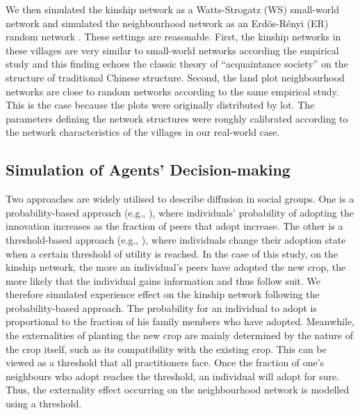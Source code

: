 \documentclass{bmcart}
\begin{document}
We then simulated the kinship network as a Watts-Strogatz (WS) small-world network \cite{Watts1998} and simulated the neighbourhood network as an Erd\"{o}s-R\'{e}nyi (ER) random network \cite{ErdHos1959}. These settings are reasonable. First, the kinship networks in these villages are very similar to small-world networks according the empirical study \cite{Xiong2017} and this finding echoes the classic theory of ``acquaintance society'' on the structure of traditional Chinese structure. Second, the land plot neighbourhood networks are close to random networks according to the same empirical study. This is the case because the plots were originally distributed by lot. The parameters defining the network structures were roughly calibrated according to the network characteristics of the villages in our real-world case. 

\subsection*{Simulation of Agents' Decision-making}
Two approaches are widely utilised to describe diffusion in social groups. One is a probability-based approach (e.g., \cite{Banerjee2013,Peres2014}), where individuals' probability of adopting the innovation increases as the fraction of peers that adopt increase. The other is a threshold-based approach (e.g., \cite{Granovetter1978,Singh2013}), where individuals change their adoption state when a certain threshold of utility is reached. In the case of this study, on the kinship network, the more an individual's peers have adopted the new crop, the more likely that the individual gains information and thus follow suit. We therefore simulated experience effect on the kinship network following the probability-based approach. The probability for an individual to adopt is proportional to the fraction of his family members who have adopted. Meanwhile, the externalities of planting the new crop are mainly determined by the nature of the crop itself, such as its compatibility with the existing crop. This can be viewed as a threshold that all practitioners face. Once the fraction of one's neighbours who adopt reaches the threshold, an individual will adopt for sure. Thus, the externality effect occurring on the neighbourhood network is modelled using a threshold.
\end{document}
